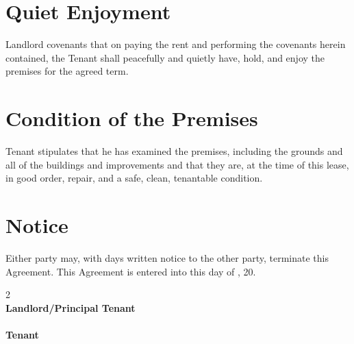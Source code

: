 \documentclass[12pt]{article}
\begin{document}
\section*{Quiet Enjoyment}
Landlord covenants that on paying the rent and performing the covenants herein contained, the Tenant shall peacefully and quietly have, hold, and enjoy the premises for the agreed term.
\section*{Condition of the Premises}
Tenant stipulates that he has examined the premises, including the grounds and all of the buildings and improvements and that they are, at the time of this lease, in good order, repair, and a safe, clean, tenantable condition.
\section*{Notice}
Either party may, with \underline{\hspace{1cm}} days written notice to the other party, terminate this Agreement.
\noindent This Agreement is entered into this \underline{\hspace{1cm}} day of \underline{\hspace{1cm}}, 20\underline{\hspace{0.5cm}}.
\vspace{24pt}
\begin{multicols}{2}
    \noindent \underline{\hspace{2.5in}} \\
    \textbf{Landlord/Principal Tenant} \\
    \vfill\null
    \columnbreak
    \noindent \underline{\hspace{2.5in}} \\
    \textbf{Tenant}
\end{multicols}
\end{document}
